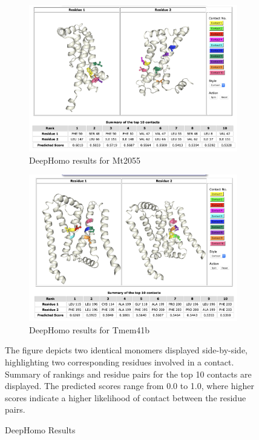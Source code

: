 \begin{figure}[htb]
    \centering %
\begin{subfigure}{0.5\textwidth}
  \includegraphics[width=\linewidth]{Results/w9_deep_homo.png}
  \caption{DeepHomo results for Mt2055}
  \label{fig:0}
\end{subfigure}\hfil %
\begin{subfigure}{0.5\textwidth}
  \includegraphics[width=\linewidth]{Results/tm_deephomo.png}
  \caption{DeepHomo results for Tmem41b}
  \label{fig:1}
\end{subfigure}
\caption{DeepHomo Results}
\small
The figure depicts two identical monomers displayed side-by-side, highlighting two corresponding residues involved in a contact. Summary of rankings and residue pairs for the top 10 contacts are displayed. The predicted scores range from 0.0 to 1.0, where higher scores indicate a higher likelihood of contact between the residue pairs.
\label{fig:deephomo}
\end{figure}

